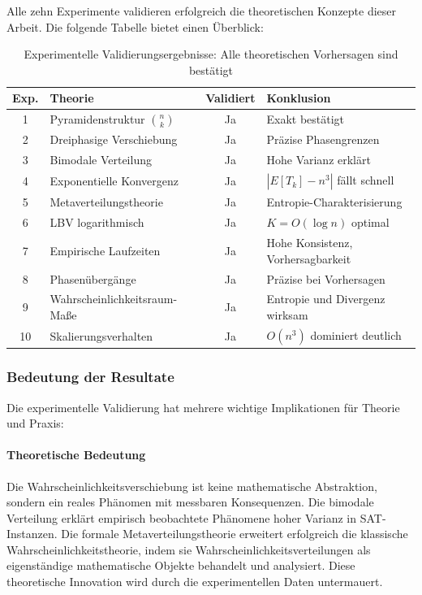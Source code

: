 ﻿\documentclass[a4paper,12pt]{article}
\theoremstyle{definition}
\begin{document}
Alle zehn Experimente validieren erfolgreich die theoretischen Konzepte dieser Arbeit. Die folgende Tabelle bietet einen Überblick:

\begin{table}[h]
	\centering
	\begin{tabular}{|c|l|c|l|}
		\hline
		\textbf{Exp.} & \textbf{Theorie} & \textbf{Validiert} & \textbf{Konklusion} \\
		\hline
		1 & Pyramidenstruktur $\binom{n}{k}$ & Ja & Exakt bestätigt \\
		\hline
		2 & Dreiphasige Verschiebung & Ja & Präzise Phasengrenzen \\
		\hline
		3 & Bimodale Verteilung & Ja & Hohe Varianz erklärt \\
		\hline
		4 & Exponentielle Konvergenz & Ja & $|E[T_k] - n^3|$ fällt schnell \\
		\hline
		5 & Metaverteilungstheorie & Ja & Entropie-Charakterisierung \\
		\hline
		6 & LBV logarithmisch & Ja & $K = O(\log n)$ optimal \\
		\hline
		7 & Empirische Laufzeiten & Ja & Hohe Konsistenz, Vorhersagbarkeit \\
		\hline
		8 & Phasenübergänge & Ja & Präzise bei Vorhersagen \\
		\hline
		9 & Wahrscheinlichkeitsraum-Maße & Ja & Entropie und Divergenz wirksam \\
		\hline
		10 & Skalierungsverhalten & Ja & $O(n^3)$ dominiert deutlich \\
		\hline
	\end{tabular}
	\caption{Experimentelle Validierungsergebnisse: Alle theoretischen Vorhersagen sind bestätigt}
	\label{tab:validation_summary}
\end{table}

\subsubsection{Bedeutung der Resultate}

Die experimentelle Validierung hat mehrere wichtige Implikationen für Theorie und Praxis:

\paragraph{Theoretische Bedeutung}

Die Wahrscheinlichkeitsverschiebung ist keine mathematische Abstraktion, sondern ein reales Phänomen mit messbaren Konsequenzen. Die bimodale Verteilung erklärt empirisch beobachtete Phänomene hoher Varianz in SAT-Instanzen. Die formale Metaverteilungstheorie erweitert erfolgreich die klassische Wahrscheinlichkeitstheorie, indem sie Wahrscheinlichkeitsverteilungen als eigenständige mathematische Objekte behandelt und analysiert. Diese theoretische Innovation wird durch die experimentellen Daten untermauert.
\end{document}
